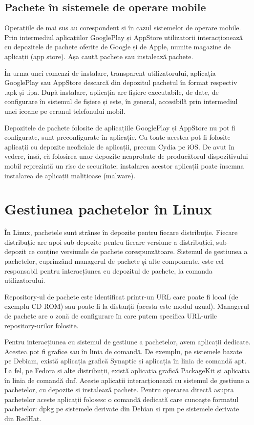 \subsection{Pachete în sistemele de operare mobile}
\label{sec:package:mobile}

Operațiile de mai sus au corespondent și în cazul sistemelor de operare mobile. Prin intermediul aplicațiilor GooglePlay și AppStore utilizatorii interacționează cu depozitele de pachete oferite de Google și de Apple, numite magazine de aplicații (app store). Așa caută pachete sau instalează pachete.

În urma unei comenzi de instalare, transparent utilizatorului, aplicația GooglePlay sau AppStore descarcă din depozitul pachetul în format respectiv .apk și .ipa. După instalare, aplicația are fișiere executabile, de date, de configurare în sistemul de fișiere și este, în general, accesibilă prin intermediul unei icoane pe ecranul telefonului mobil.

Depozitele de pachete folosite de aplicațiile GooglePlay și AppStore nu pot fi configurate, sunt preconfigurate în aplicație. Cu toate acestea pot fi folosite aplicații cu depozite neoficiale de aplicații, precum Cydia pe iOS. De avut în vedere, însă, că folosirea unor depozite neaprobate de producătorul dispozitivului mobil reprezintă un risc de securitate; instalarea acestor aplicații poate însemna instalarea de aplicații malițioase (malware).

\section{Gestiunea pachetelor în Linux}
\label{sec:package:linux}

În Linux, pachetele sunt strânse în depozite pentru fiecare distribuție. Fiecare distribuție are apoi sub-depozite pentru fiecare versiune a distribuției, sub-depozit ce conține versiunile de pachete corespunzătoare. Sistemul de gestiunea a pachetelor, cuprinzând managerul de pachete și alte componente, este cel responsabil pentru interacțiunea cu depozitul de pachete, la comanda utilizatorului.

Repository-ul de pachete este identificat printr-un URL care poate fi local (de exemplu CD-ROM) sau poate fi la distanță (acesta este modul uzual). Managerul de pachete are o zonă de configurare în care putem specifica URL-urile repository-urilor folosite.

Pentru interacțiunea cu sistemul de gestiune a pachetelor, avem aplicații dedicate. Acestea pot fi grafice sau în linia de comandă. De exemplu, pe sistemele bazate pe Debiam, există aplicația grafică Synaptic și aplicația în linia de comandă apt. La fel, pe Fedora și alte distribuții, există aplicația grafică PackageKit și aplicația în linia de comandă dnf. Aceste aplicații interacționează cu sistemul de gestiune a pachetelor, cu depozite și instalează pachete. Pentru operarea directă asupra pachetelor aceste aplicații folosesc o comandă dedicată care cunoaște formatul pachetelor: dpkg pe sistemele derivate din Debian și rpm pe sistemele derivate din RedHat.

